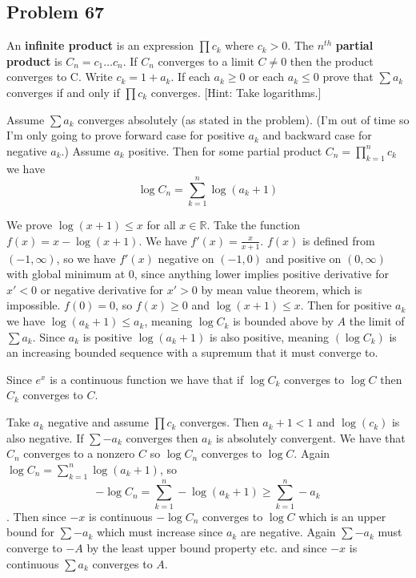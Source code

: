 \documentclass{amsart}
\begin{document}
\subsection*{Problem 67} An \textbf{infinite product} is an expression $\prod c_k$ where 
$c_k>0$. The $n^{th}$ \textbf{partial product} is $C_n = c_1\dots c_n$. If $C_n$ converges to a 
limit $C\neq0$ then the product converges to C. Write $c_k = 1+a_k$. If each $a_k\geq0$ or each 
$a_k\leq 0$ prove that $\sum a_k$ converges if and only if $\prod c_k$ converges. 
[Hint: Take logarithms.]

\medskip \noindent Assume $\sum a_k$ converges absolutely (as stated in the problem). (I'm out of time so I'm only going
to prove forward case for positive $a_k$ and backward case for negative $a_k$.) Assume $a_k$ positive. Then for some
partial product $C_n=\prod_{k=1}^n c_k$ we have \[\log C_n = \sum_{k=1}^n\log(a_k+1)\]

We prove $\log(x+1)\leq x$ for all $x\in\mathbb{R}$. Take the function $f(x)=x-\log(x+1)$. We have 
$f'(x)=\frac{x}{x+1}$. $f(x)$ is defined from $(-1, \infty)$, so we have $f'(x)$ negative on $(-1, 0)$ and positive on
$(0, \infty)$ with global minimum at $0$, since anything lower implies positive derivative for $x'<0$ or negative derivative
for $x'>0$ by mean value theorem, which is impossible. $f(0)=0$, so $f(x)\geq 0$ and $\log(x+1)\leq x$. Then for positive
$a_k$ we have $\log(a_k+1)\leq a_k$, meaning $\log C_k$ is bounded above by $A$ the limit of $\sum a_k$. Since $a_k$ is positive
$\log(a_k+1)$ is also positive, meaning $(\log C_k)$ is an increasing bounded sequence with a supremum that it must converge to.

Since $e^x$ is a continuous function we have that if $\log C_k$ converges to $\log C$ then $C_k$ converges to $C$. 

Take $a_k$ negative and assume $\prod c_k$ converges. Then $a_k+1<1$ and $\log(c_k)$ is also negative. If $\sum -a_k$ converges then $a_k$ is absolutely
convergent. We have that $C_n$ converges to a nonzero $C$ so $\log C_n$ converges to $\log C$.
Again $\log C_n = \sum_{k=1}^n \log(a_k+1)$, so \[-\log C_n = \sum_{k=1}^n-\log (a_k+1)\geq\sum_{k=1}^n -a_k\]. Then since $-x$ is continuous $-\log C_n$
converges to $\log C$ which is an upper bound for $\sum -a_k$ which must increase since $a_k$ are negative. Again $\sum -a_k$ must converge to $-A$ by
the least upper bound property etc. and since $-x$ is continuous $\sum a_k$ converges to $A$. 

\newpage
\end{document}
